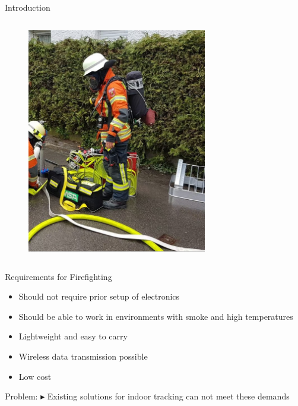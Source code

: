 \documentclass[aspectratio=169]{beamer}
\begin{document}
{\begin{frame}{Introduction}
\begin{columns}
				\begin{figure}
					\centering
					\includegraphics[width=0.7\textwidth]{firefighter.png}
				\end{figure}
	
		\end{columns}
		
		
	\end{frame}
	
	\begin{frame}{Requirements for Firefighting}
		\begin{itemize}
			\item Should not require prior setup of electronics
			\item Should be able to work in environments with smoke and high temperatures
			\item Lightweight and easy to carry %
			\item Wireless data transmission possible %
			\item Low cost %
		\end{itemize}
		
		\begin{block}{Problem:}
			$\blacktriangleright$ Existing solutions for indoor tracking can not meet these demands
		\end{block}
		
	\end{frame}
	
}
\end{document}
